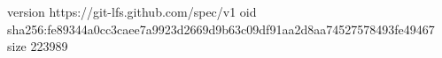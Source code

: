 version https://git-lfs.github.com/spec/v1
oid sha256:fe89344a0cc3caee7a9923d2669d9b63c09df91aa2d8aa74527578493fe49467
size 223989
